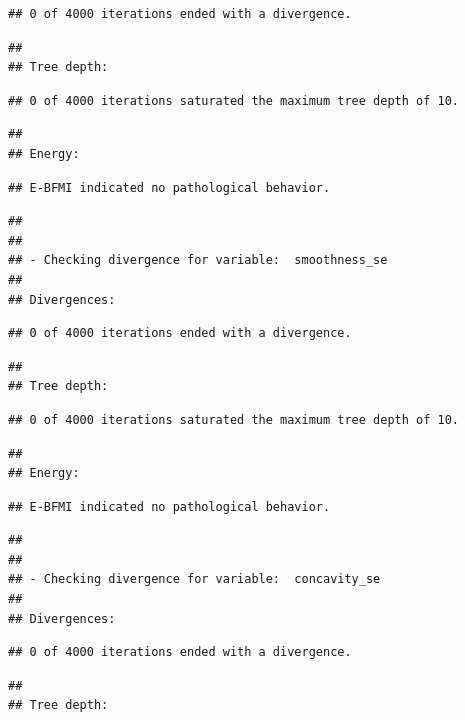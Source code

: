 \documentclass[
]{article}
\begin{document}
\begin{verbatim}
## 0 of 4000 iterations ended with a divergence.
\end{verbatim}

\begin{verbatim}
## 
## Tree depth:
\end{verbatim}

\begin{verbatim}
## 0 of 4000 iterations saturated the maximum tree depth of 10.
\end{verbatim}

\begin{verbatim}
## 
## Energy:
\end{verbatim}

\begin{verbatim}
## E-BFMI indicated no pathological behavior.
\end{verbatim}

\begin{verbatim}
## 
## 
## - Checking divergence for variable:  smoothness_se 
## 
## Divergences:
\end{verbatim}

\begin{verbatim}
## 0 of 4000 iterations ended with a divergence.
\end{verbatim}

\begin{verbatim}
## 
## Tree depth:
\end{verbatim}

\begin{verbatim}
## 0 of 4000 iterations saturated the maximum tree depth of 10.
\end{verbatim}

\begin{verbatim}
## 
## Energy:
\end{verbatim}

\begin{verbatim}
## E-BFMI indicated no pathological behavior.
\end{verbatim}

\begin{verbatim}
## 
## 
## - Checking divergence for variable:  concavity_se 
## 
## Divergences:
\end{verbatim}

\begin{verbatim}
## 0 of 4000 iterations ended with a divergence.
\end{verbatim}

\begin{verbatim}
## 
## Tree depth:
\end{verbatim}
\end{document}
